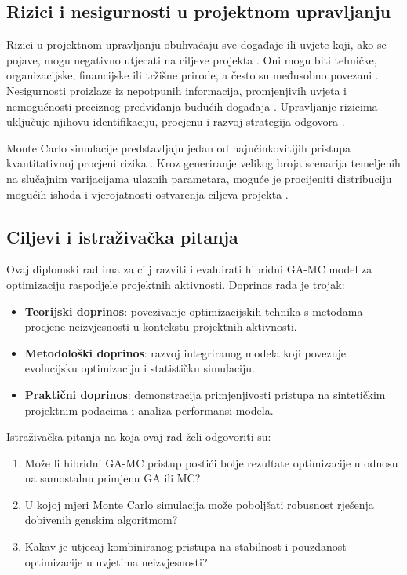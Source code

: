 \subsection{Rizici i nesigurnosti u projektnom upravljanju}
Rizici u projektnom upravljanju obuhvaćaju sve događaje ili uvjete koji, ako se pojave, mogu negativno utjecati na ciljeve projekta \cite{Hillson2009}. Oni mogu biti tehničke, organizacijske, financijske ili tržišne prirode, a često su međusobno povezani \cite{PMI2021}. Nesigurnosti proizlaze iz nepotpunih informacija, promjenjivih uvjeta i nemogućnosti preciznog predviđanja budućih događaja \cite{Smith2014}. Upravljanje rizicima uključuje njihovu identifikaciju, procjenu i razvoj strategija odgovora \cite{Hillson2009}.

Monte Carlo simulacije predstavljaju jedan od najučinkovitijih pristupa kvantitativnoj procjeni rizika \cite{Vose2008}. Kroz generiranje velikog broja scenarija temeljenih na slučajnim varijacijama ulaznih parametara, moguće je procijeniti distribuciju mogućih ishoda i vjerojatnosti ostvarenja ciljeva projekta \cite{Rubinstein2016}.

\subsection{Ciljevi i istraživačka pitanja}
Ovaj diplomski rad ima za cilj razviti i evaluirati hibridni GA-MC model za optimizaciju raspodjele projektnih aktivnosti. Doprinos rada je trojak:
\begin{itemize}
    \item \textbf{Teorijski doprinos}: povezivanje optimizacijskih tehnika s metodama procjene neizvjesnosti u kontekstu projektnih aktivnosti.
    \item \textbf{Metodološki doprinos}: razvoj integriranog modela koji povezuje evolucijsku optimizaciju i statističku simulaciju.
    \item \textbf{Praktični doprinos}: demonstracija primjenjivosti pristupa na sintetičkim projektnim podacima i analiza performansi modela.
\end{itemize}

Istraživačka pitanja na koja ovaj rad želi odgovoriti su:
\begin{enumerate}
    \item Može li hibridni GA-MC pristup postići bolje rezultate optimizacije u odnosu na samostalnu primjenu GA ili MC?
    \item U kojoj mjeri Monte Carlo simulacija može poboljšati robusnost rješenja dobivenih genskim algoritmom?
    \item Kakav je utjecaj kombiniranog pristupa na stabilnost i pouzdanost optimizacije u uvjetima neizvjesnosti?
\end{enumerate}

